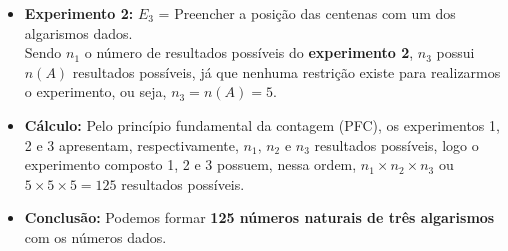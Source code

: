 \documentclass[a4paper,12pt]{article}
\begin{document}
\begin{enumerate}
\begin{itemize}
    \item[\ding{176}] \textbf{Experimento 2:} $E_3$ = Preencher a posição das centenas com um dos algarismos dados.\\ Sendo $n_{1}$ o número de resultados possíveis do \textbf{experimento 2}, $n_{3}$ possui $n(A)$ resultados possíveis, já que nenhuma restrição existe para realizarmos o experimento, ou seja, $n_{3} = n(A) = 5$.
    
    \item[\ding{177}] \textbf{Cálculo:} Pelo princípio fundamental da contagem (PFC), os experimentos 1, 2 e 3 apresentam, respectivamente, $n_{1},\, n_{2} \textrm{ e } n_{3}$ resultados possíveis, logo o experimento composto 1, 2 e 3 possuem, nessa ordem, $n_{1} \times n_{2} \times n_{3}$ ou $5 \times 5 \times 5 = 125$ resultados possíveis.
    \item[\ding{178}] \textbf{Conclusão:} Podemos formar \textbf{125 números naturais de três algarismos} com os números dados.
  \end{itemize}
  

\end{enumerate}
\end{document}
